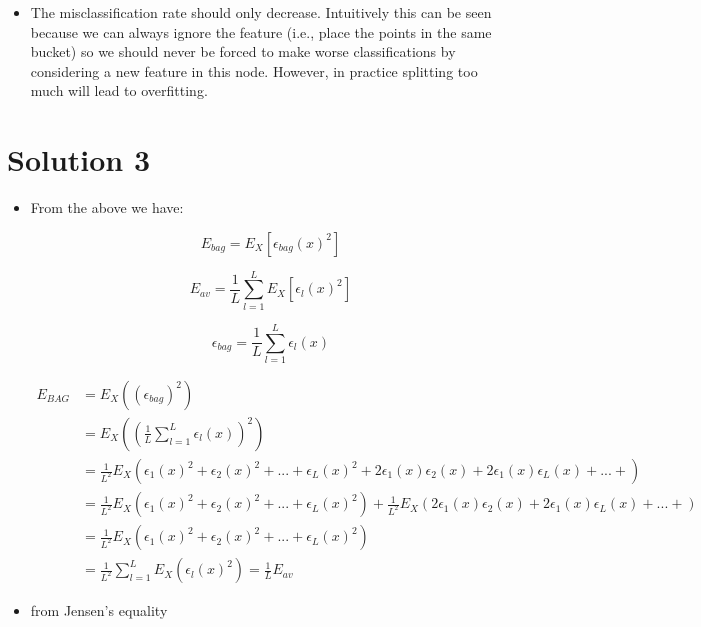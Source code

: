 \documentclass[12pt]{article}
\begin{document}
\begin{itemize}
\item
The misclassification rate should only decrease. Intuitively this can be seen because we can always ignore the feature (i.e., place the points in the same bucket) so we should never be forced to make worse classifications by considering a new feature in this node. However, in practice splitting too much will lead to overfitting.

\end{itemize}
\section*{Solution 3}
\begin{itemize}
\item 
From the above we have:

\begin{equation}
E_{bag} = E_X[\epsilon_{bag}(x)^2]
\end{equation}

\begin{equation}
E_{av} = \frac{1}{L}\sum_{l=1}^LE_X[\epsilon_{l}(x)^2]
\end{equation}


\begin{equation}
\epsilon_{bag}=\frac{1}{L}{\displaystyle \sum_{l=1}^{L}\epsilon_{l}(x)}
\end{equation}

\begin{equation}
\begin{split}
E_{BAG}&=E_{X}((\epsilon_{bag})^{2})\\&=E_{X}((\frac{1}{L}{\displaystyle \sum_{l=1}^{L}\epsilon_{l}(x)})^{2})\\&=\frac{1}{L^{2}}E_{X}(\epsilon_{1}(x)^{2}+\epsilon_{2}(x)^{2}+...+\epsilon_{L}(x)^{2}+2\epsilon_{1}(x)\epsilon_{2}(x)+2\epsilon_{1}(x)\epsilon_{L}(x)+...+)\\&=\frac{1}{L^{2}}E_{X}(\epsilon_{1}(x)^{2}+\epsilon_{2}(x)^{2}+...+\epsilon_{L}(x)^{2})+\frac{1}{L^{2}}E_{X}(2\epsilon_{1}(x)\epsilon_{2}(x)+2\epsilon_{1}(x)\epsilon_{L}(x)+...+)\\&=\frac{1}{L^{2}}E_{X}(\epsilon_{1}(x)^{2}+\epsilon_{2}(x)^{2}+...+\epsilon_{L}(x)^{2})\\&=\frac{1}{L^{2}}{\displaystyle \sum_{l=1}^{L}}E_{X}(\epsilon_{l}(x)^{2})=\frac{1}{L}E_{av}
\end{split}
\end{equation}




\item
from Jensen's equality


\end{itemize}
\end{document}
